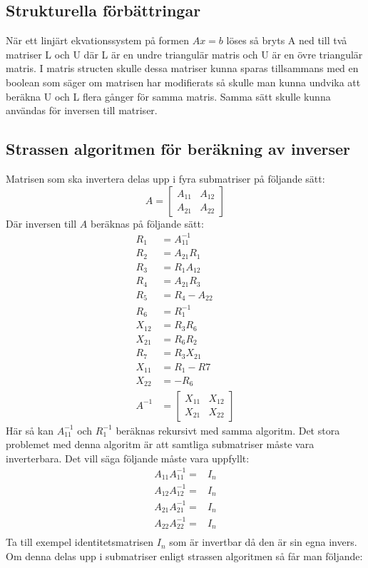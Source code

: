 \subsection{Strukturella förbättringar}
När ett linjärt ekvationssystem på formen $Ax=b $ löses så bryts A ned till två matriser L och U där L är en undre triangulär matris och U är en övre triangulär matris\cite{Ching}. I matris structen skulle dessa matriser kunna sparas tillsammans med en boolean som säger om matrisen har modifierats så skulle man kunna undvika att beräkna U och L flera gånger för samma matris. Samma sätt skulle kunna användas för inversen till matriser. 

\subsection{Strassen algoritmen för beräkning av inverser}
\label{sec:inverse_nackdelar}
Matrisen som ska invertera delas upp i fyra submatriser på följande sätt:
$$A=\begin{bmatrix}
A_{11} & A_{12} \\
A_{21}& A_{22}
 \end{bmatrix}
 $$
 Där inversen till $A$ beräknas på följande sätt\cite{Petkovic2013}:
 \begin{align}
  R_1 & =A_{11}^{-1} \\
  R_2 & =A_{21}R_1 \\
  R_3 & =R_1A_{12} \\
  R_4 & =A_{21}R_3 \\
  R_5 & =R_4 -A_{22} \\
  R_6 & =R_1^{-1} \\
  X_{12} & =R_3R_6 \\
  X_{21} & =R_6R_2 \\
  R_7 & =R_3X_{21} \\
  X_{11} & =R_1 -R7 \\
  X_{22} & =-R_6 \\
 A^{-1} & =\begin{bmatrix}
X_{11} & X_{12} \\
X_{21}& X_{22}
 \end{bmatrix}
 \end{align}
 Här så kan $A_{11}^{-1}$ och $R_1^{-1}$ beräknas rekursivt med samma algoritm. Det stora problemet med denna algoritm är att samtliga submatriser måste vara inverterbara. Det vill säga följande måste vara uppfyllt:
 \begin{align}
   A_{11}A_{11}^{-1}= & I_n \\
   A_{12}A_{12}^{-1}= & I_n \\
   A_{21}A_{21}^{-1}= & I_n \\
   A_{22}A_{22}^{-1}= & I_n \\
 \end{align}
 Ta till exempel identitetsmatrisen $I_n$ som är invertbar då den är sin egna invers. Om denna delas upp i submatriser enligt strassen algoritmen så får man följande:
 
